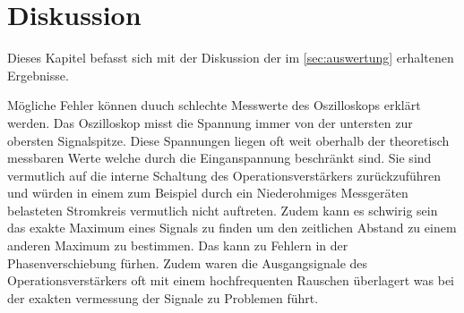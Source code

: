 

\section{Diskussion}
\label{sec:Diskussion}

Dieses Kapitel befasst sich mit der Diskussion der im \autoref{sec:auswertung} erhaltenen Ergebnisse.






Mögliche Fehler können duuch schlechte Messwerte des Oszilloskops erklärt werden. Das Oszilloskop misst 
die Spannung immer von der untersten zur obersten Signalspitze. Diese Spannungen liegen oft weit oberhalb 
der theoretisch messbaren Werte welche durch die Einganspannung beschränkt sind. Sie sind vermutlich auf 
die interne Schaltung des Operationsverstärkers zurückzuführen und würden in einem zum Beispiel
durch ein Niederohmiges Messgeräten belasteten Stromkreis vermutlich nicht auftreten. Zudem kann es schwirig
sein das exakte Maximum eines Signals zu finden um den zeitlichen Abstand zu einem anderen Maximum zu bestimmen.
Das kann zu Fehlern in der Phasenverschiebung fürhen. Zudem waren die Ausgangsignale des Operationsverstärkers
oft mit einem hochfrequenten Rauschen überlagert was bei der exakten vermessung der Signale zu Problemen führt.
























